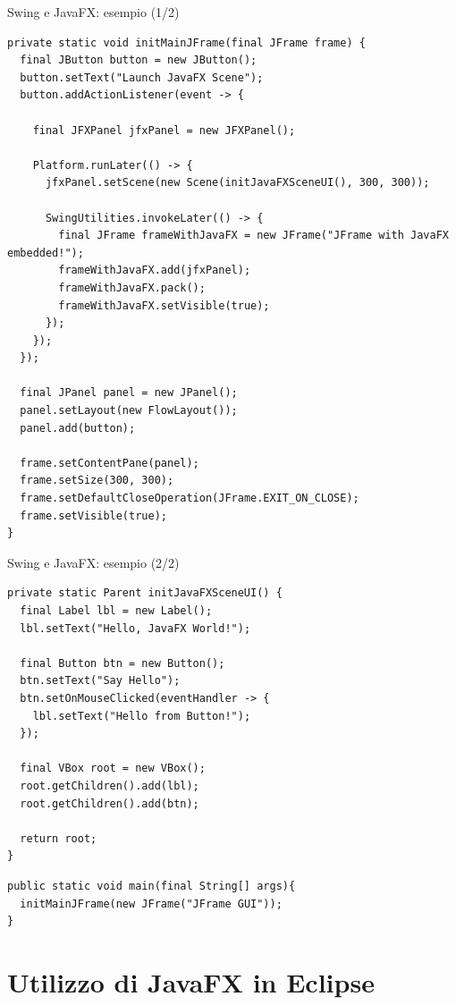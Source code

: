 \documentclass[presentation]{beamer}
\begin{document}
\begin{frame}[fragile]{Swing e JavaFX: esempio (1/2)}
\begin{lstlisting}[basicstyle=\tiny]
private static void initMainJFrame(final JFrame frame) {
  final JButton button = new JButton();
  button.setText("Launch JavaFX Scene");
  button.addActionListener(event -> {

    final JFXPanel jfxPanel = new JFXPanel();

    Platform.runLater(() -> {
      jfxPanel.setScene(new Scene(initJavaFXSceneUI(), 300, 300));

      SwingUtilities.invokeLater(() -> {
        final JFrame frameWithJavaFX = new JFrame("JFrame with JavaFX embedded!");
        frameWithJavaFX.add(jfxPanel);
        frameWithJavaFX.pack();
        frameWithJavaFX.setVisible(true);
      });
    });
  });

  final JPanel panel = new JPanel();
  panel.setLayout(new FlowLayout());
  panel.add(button);

  frame.setContentPane(panel);
  frame.setSize(300, 300);
  frame.setDefaultCloseOperation(JFrame.EXIT_ON_CLOSE);
  frame.setVisible(true);
}
\end{lstlisting}
\end{frame}

\begin{frame}[fragile]{Swing e JavaFX: esempio (2/2)}
\begin{lstlisting}[basicstyle=\tiny]
private static Parent initJavaFXSceneUI() {
  final Label lbl = new Label();
  lbl.setText("Hello, JavaFX World!");

  final Button btn = new Button();
  btn.setText("Say Hello");
  btn.setOnMouseClicked(eventHandler -> {
    lbl.setText("Hello from Button!");
  });

  final VBox root = new VBox();
  root.getChildren().add(lbl);
  root.getChildren().add(btn);

  return root;
}
\end{lstlisting}

\begin{lstlisting}[basicstyle=\tiny]
public static void main(final String[] args){
  initMainJFrame(new JFrame("JFrame GUI"));
}
\end{lstlisting}
\end{frame}

\section{Utilizzo di JavaFX in Eclipse}
\end{document}
